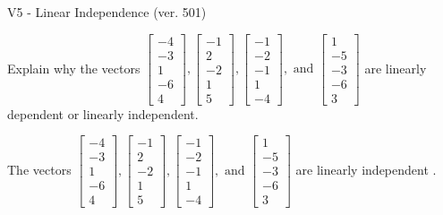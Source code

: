 \begin{exercise}
  \begin{exerciseTitle}V5 - Linear Independence (ver. 501)\end{exerciseTitle}
  \begin{exerciseStatement}
    Explain why the vectors \(\left[\begin{array}{r}
-4 \\
-3 \\
1 \\
-6 \\
4
\end{array}\right] , \left[\begin{array}{r}
-1 \\
2 \\
-2 \\
1 \\
5
\end{array}\right] , \left[\begin{array}{r}
-1 \\
-2 \\
-1 \\
1 \\
-4
\end{array}\right] , \text{ and } \left[\begin{array}{r}
1 \\
-5 \\
-3 \\
-6 \\
3
\end{array}\right]\) are linearly dependent or linearly independent.	


  \end{exerciseStatement}
  \begin{exerciseAnswer}
   The vectors \(\left[\begin{array}{r}
-4 \\
-3 \\
1 \\
-6 \\
4
\end{array}\right] , \left[\begin{array}{r}
-1 \\
2 \\
-2 \\
1 \\
5
\end{array}\right] , \left[\begin{array}{r}
-1 \\
-2 \\
-1 \\
1 \\
-4
\end{array}\right] , \text{ and } \left[\begin{array}{r}
1 \\
-5 \\
-3 \\
-6 \\
3
\end{array}\right]\) are 
  	 linearly independent  .
  


  \end{exerciseAnswer}
\end{exercise}
